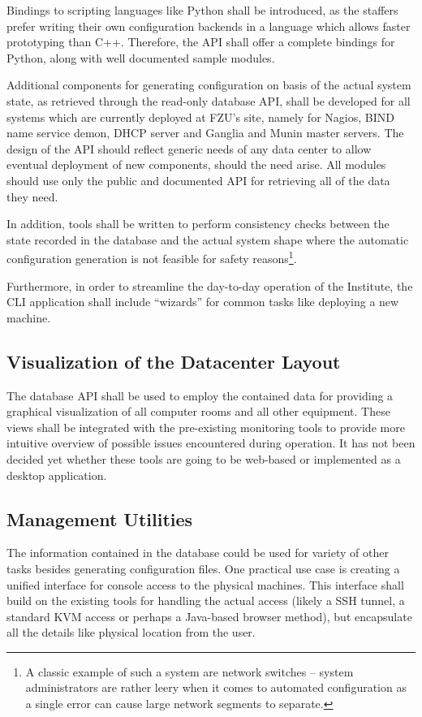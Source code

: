 \documentclass{article}
\begin{document}
Bindings to scripting languages like Python shall be introduced, as the staffers prefer writing their own configuration backends
in a language which allows faster prototyping than C++.  Therefore, the API shall offer a complete bindings for Python, along with
well documented sample modules.

Additional components for generating configuration on basis of the actual system state, as retrieved through the read-only
database API, shall be developed for all systems which are currently deployed at FZU's site, namely for Nagios, BIND name service
demon, DHCP server and Ganglia and Munin master servers.  The design of the API should reflect generic needs of any data center to
allow eventual deployment of new components, should the need arise.  All modules should use only the public and documented API for
retrieving all of the data they need.

In addition, tools shall be written to perform consistency checks between the state recorded in the database and the actual system
shape where the automatic configuration generation is not feasible for safety reasons\footnote{A classic example of such a system
are network switches -- system administrators are rather leery when it comes to automated configuration as a single error can
cause large network segments to separate.}.

Furthermore, in order to streamline the day-to-day operation of the Institute, the CLI application shall include ``wizards'' for
common tasks like deploying a new machine.

\subsection{Visualization of the Datacenter Layout}

The database API shall be used to employ the contained data for providing a graphical visualization of all computer rooms and all
other equipment.  These views shall be integrated with the pre-existing monitoring tools to provide more intuitive overview of
possible issues encountered during operation.  It has not been decided yet whether these tools are going to be web-based or
implemented as a desktop application.

\subsection{Management Utilities}

The information contained in the database could be used for variety of other tasks besides generating configuration files.  One
practical use case is creating a unified interface for console access to the physical machines.  This interface shall build on the
existing tools for handling the actual access (likely a SSH tunnel, a standard KVM access or perhaps a Java-based browser method),
but encapsulate all the details like physical location from the user.
\end{document}
